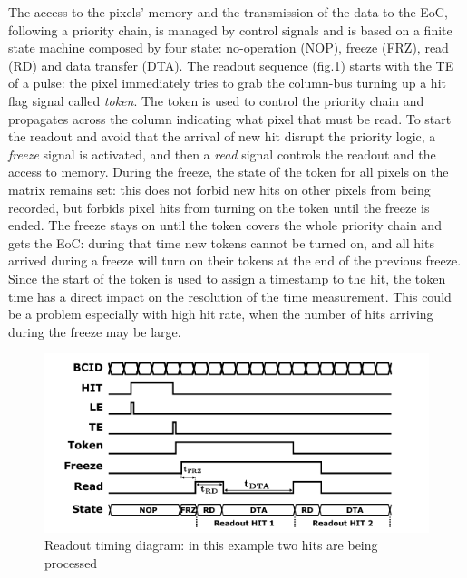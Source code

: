     The access to the pixels' memory and the transmission of the data to the EoC, following a priority chain, is managed by control signals and is based on a finite state machine composed by four state: no-operation (NOP), freeze (FRZ), read (RD) and data transfer (DTA). The readout sequence (fig.\ref{fig:readout_timing}) starts with the TE of a pulse: the pixel immediately tries to grab the column-bus turning up a hit flag signal called \textit{token}.
    The token is used to control the priority chain and propagates across the column indicating what pixel that must be read. To start the readout and avoid that the arrival of new hit disrupt the priority logic, a \textit{freeze} signal is activated, and then a \textit{read} signal controls the readout and the access to memory.
    During the freeze, the state of the token for all pixels on the matrix remains set: this does not forbid new hits on other pixels from being recorded, but forbids pixel hits from turning on the token until the freeze is ended. 
    The freeze stays on until the token covers the whole priority chain and gets the EoC: during that time new tokens cannot be turned on, and all hits arrived during a freeze will turn on their tokens at the end of the previous freeze.  
    Since the start of the token is used to assign a timestamp to the hit, the token time has a direct impact on the resolution of the time measurement. This could be a problem especially with high hit rate, when the number of hits arriving during the freeze may be large. 
    \begin{figure}[h!]
        \centering
        \includegraphics[width=.5\linewidth]{figures/Monopix1/readout_timing.png}
        \caption{Readout timing diagram: in this example two hits are being processed}
        \label{fig:readout_timing}
    \end{figure}

